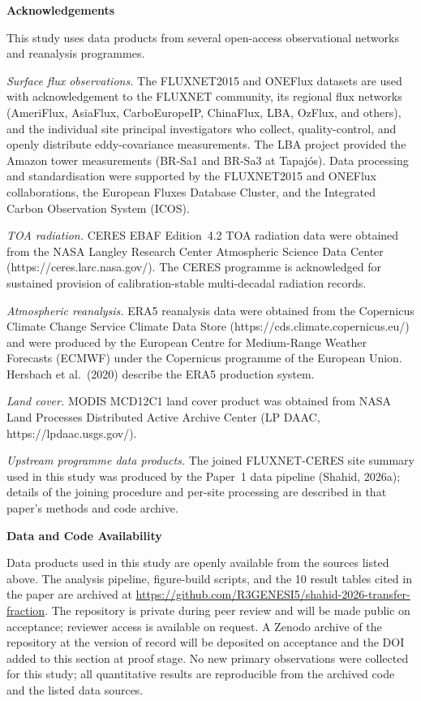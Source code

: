 \textbf{Acknowledgements}

This study uses data products from several open-access observational
networks and reanalysis programmes.

\textit{Surface flux observations.} The FLUXNET2015 and ONEFlux datasets
are used with acknowledgement to the FLUXNET community, its regional
flux networks (AmeriFlux, AsiaFlux, CarboEuropeIP, ChinaFlux, LBA,
OzFlux, and others), and the individual site principal investigators who
collect, quality-control, and openly distribute eddy-covariance
measurements. The LBA project provided the Amazon tower measurements
(BR-Sa1 and BR-Sa3 at Tapajós). Data processing and standardisation
were supported by the FLUXNET2015 and ONEFlux collaborations, the
European Fluxes Database Cluster, and the Integrated Carbon Observation
System (ICOS).

\textit{TOA radiation.} CERES EBAF Edition~4.2 TOA radiation data were
obtained from the NASA Langley Research Center Atmospheric Science Data
Center (https://ceres.larc.nasa.gov/). The CERES programme is
acknowledged for sustained provision of calibration-stable multi-decadal
radiation records.

\textit{Atmospheric reanalysis.} ERA5 reanalysis data were obtained from
the Copernicus Climate Change Service Climate Data Store
(https://cds.climate.copernicus.eu/) and were produced by the European
Centre for Medium-Range Weather Forecasts (ECMWF) under the Copernicus
programme of the European Union. Hersbach et al.\ (2020) describe the
ERA5 production system.

\textit{Land cover.} MODIS MCD12C1 land cover product was obtained from
NASA Land Processes Distributed Active Archive Center (LP DAAC,
https://lpdaac.usgs.gov/).

\textit{Upstream programme data products.} The joined FLUXNET-CERES
site summary used in this study was produced by the Paper~1 data
pipeline (Shahid, 2026a); details of the joining procedure and
per-site processing are described in that paper's methods and code
archive.

\textbf{Data and Code Availability}

Data products used in this study are openly available from the sources
listed above. The analysis pipeline, figure-build scripts, and the 10
result tables cited in the paper are archived at
\url{https://github.com/R3GENESI5/shahid-2026-transfer-fraction}. The
repository is private during peer review and will be made public on
acceptance; reviewer access is available on request. A Zenodo archive
of the repository at the version of record will be deposited on
acceptance and the DOI added to this section at proof stage. No new
primary observations were collected for this study; all quantitative
results are reproducible from the archived code and the listed data
sources.

